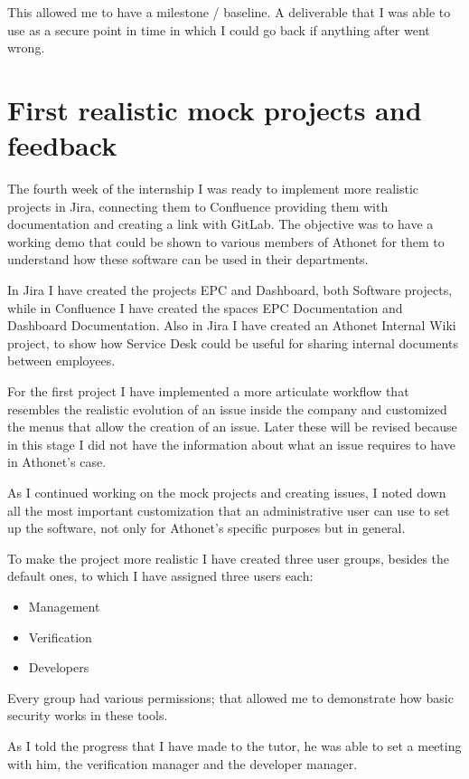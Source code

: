 	This allowed me to have a milestone / baseline.
	A deliverable that I was able to use as a secure point in time in which I could go back if anything after went wrong.
	
\section{First realistic mock projects and feedback}
	
	The fourth week of the internship I was ready to implement more realistic projects in Jira, connecting them to Confluence providing them with documentation and creating a link with GitLab.
	The objective was to have a working demo that could be shown to various members of Athonet for them to understand how these software can be used in their departments.

	In Jira I have created the projects EPC and Dashboard, both Software projects, while in Confluence I have created the spaces EPC Documentation and Dashboard Documentation.
	Also in Jira I have created an Athonet Internal Wiki project, to show how Service Desk could be useful for sharing internal documents between employees.
	
	For the first project I have implemented a more articulate workflow that resembles the realistic evolution of an issue inside the company and customized the menus that allow the creation of an issue.
	Later these will be revised because in this stage I did not have the information about what an issue requires to have in Athonet's case. 
	
	As I continued working on the mock projects and creating issues, I noted down all the most important customization that an administrative user can use to set up the software, not only for Athonet's specific purposes but in general.
	
	To make the project more realistic I have created three user groups, besides the default ones, to which I have assigned three users each:
	\begin{itemize}
		\item Management
		\item Verification
		\item Developers
	\end{itemize}
	
	Every group had various permissions; that allowed me to demonstrate how basic security works in these tools.
	
	As I told the progress that I have made to the tutor, he was able to set a meeting with him, the verification manager and the developer manager.
	
